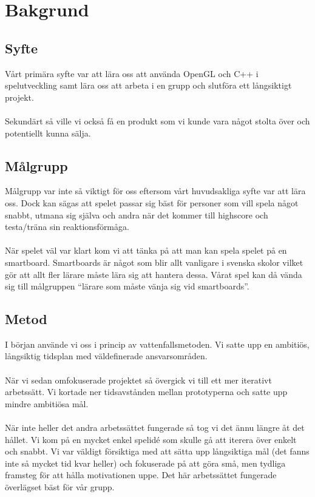 \documentclass[a4paper]{article}
\begin{document}
\newpage
\section{Bakgrund}
\subsection{Syfte}
Vårt primära syfte var att lära oss att använda OpenGL och C++ i spelutveckling samt lära oss att arbeta i en grupp och slutföra ett långsiktigt projekt.
\\
\\
Sekundärt så ville vi också få en produkt som vi kunde vara något stolta över och potentiellt kunna sälja.

\subsection{Målgrupp}
Målgrupp var inte så viktigt för oss eftersom vårt huvudsakliga syfte var att lära oss. Dock kan sägas att spelet passar sig bäst för personer som vill spela något snabbt, utmana sig själva och andra när det kommer till highscore och testa/träna sin reaktionsförmåga.
\\
\\
När spelet väl var klart kom vi att tänka på att man kan spela spelet på en smartboard. Smartboards är något som blir allt vanligare i svenska skolor vilket gör att allt fler lärare måste lära sig att hantera dessa. Vårat spel kan då vända sig till målgruppen “lärare som måste vänja sig vid smartboards”. 

\subsection{Metod}
I början använde vi oss i princip av vattenfallsmetoden. Vi satte upp en ambitiös, långsiktig tidsplan med väldefinerade ansvarsområden.
\\
\\
När vi sedan omfokuserade projektet så övergick vi till ett mer iterativt arbetssätt. Vi kortade ner tidsavstånden mellan prototyperna och satte upp  mindre ambitiösa mål.
\\
\\
När inte heller det andra arbetssättet fungerade så tog vi det ännu längre åt det hållet. Vi kom på en mycket enkel spelidé som skulle gå att iterera över enkelt och snabbt. Vi var väldigt försiktiga med att sätta upp långsiktiga mål (det fanns inte så mycket tid kvar heller) och fokuserade på att göra små, men tydliga framsteg för att hålla motivationen uppe. Det här arbetssättet fungerade överlägset bäst för vår grupp.
\end{document}
